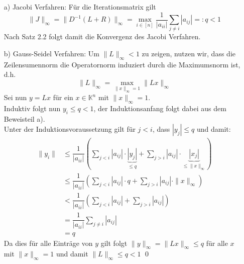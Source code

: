 \documentclass{article}
\begin{document}
\begin{enumerate}
    \item[a)] Jacobi Verfahren: Für die Iterationsmatrix gilt
    \[\|J\|_\infty = \|D^{-1}(L+R)\|_\infty = \max_{i\in[n]}\dfrac{1}{|a_{ii}|}\sum_{j\neq i}|a_{ij}| =: q < 1\]
    Nach Satz 2.2 folgt damit die Konvergenz des Jacobi Verfahren.
    \item[b)] Gauss-Seidel Verfahren: Um $\|L\|_\infty < 1$ zu zeigen, nutzen wir, 
    dass die Zeilensumennorm die Operatornorm induziert durch die Maximumsnorm ist, d.h.
    \[\|L\|_\infty = \max_{\|x\|_\infty = 1} \|Lx\|_\infty\]
    Sei nun $y=Lx$ für ein $x\in\mathbb{K}^n$ mit $\|x\|_\infty=1$. \\
    Induktiv folgt nun $y_i \le q < 1$, der Induktionsanfang folgt dabei aus dem Beweisteil a). \\
    Unter der Induktionsvoraussetzung gilt für $j<i$, dass $|y_j|\le q$ und damit:
    \begin{align*}
        \|y_i\| &\le \dfrac{1}{|a_{ii}|}\left(\sum_{j<i}|a_{ij}|\cdot\underbrace{|y_j|}_{\le q}
        +\sum_{j>i}|a_{ij}|\cdot\underbrace{|x_j|}_{\le \|x\|_\infty}\right) \\
        &\le \dfrac{1}{|a_{ii}|}\left(\sum_{j<i}|a_{ij}|\cdot q+\sum_{j>i}|a_{ij}|\cdot \|x\|_\infty\right) \\
        & < \dfrac{1}{|a_{ii}|}\left(\sum_{j<i}|a_{ij}|+\sum_{j>i}|a_{ij}|\right) \\
        & = \dfrac{1}{|a_{ii}|}\sum_{j\neq i} |a_{ij}| \\
        & = q
    \end{align*}
    Da dies für alle Einträge von $y$ gilt folgt $\|y\|_\infty = \|Lx\|_\infty \leq q$ für alle $x$ 
    mit $\|x\|_\infty=1$ und damit $\|L\|_\infty \leq q < 1$ 
    \qed
\end{enumerate}
\end{document}
